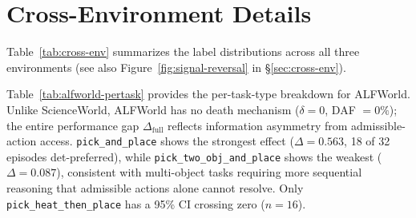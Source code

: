 \documentclass[11pt]{article}
\begin{document}
\section{Cross-Environment Details}
\label{app:cross-env-details}

Table~\ref{tab:cross-env} summarizes the label distributions across all three environments (see also Figure~\ref{fig:signal-reversal} in \S\ref{sec:cross-env}).

\begin{table}[h]
\centering
\small
{}
\caption{Cross-environment label distribution. ``Deterministic'' denotes qualitatively different computation modes: ScienceWorld = oracle simulator with ground-truth state; MATH = Python code interpreter; ALFWorld = admissible-action enumeration. $\dagger$\,ALFWorld's deterministic advantage stems from information asymmetry, not death avoidance.}
\label{tab:cross-env}
\end{table}

Table~\ref{tab:alfworld-pertask} provides the per-task-type breakdown for ALFWorld. Unlike ScienceWorld, ALFWorld has no death mechanism ($\delta = 0$, DAF $= 0\%$); the entire performance gap $\Delta_{\text{full}}$ reflects information asymmetry from admissible-action access. \texttt{pick\_and\_place} shows the strongest effect ($\Delta = 0.563$, 18 of 32 episodes det-preferred), while \texttt{pick\_two\_obj\_and\_place} shows the weakest ($\Delta = 0.087$), consistent with multi-object tasks requiring more sequential reasoning that admissible actions alone cannot resolve. Only \texttt{pick\_heat\_then\_place} has a 95\% CI crossing zero ($n{=}16$).
\end{document}
